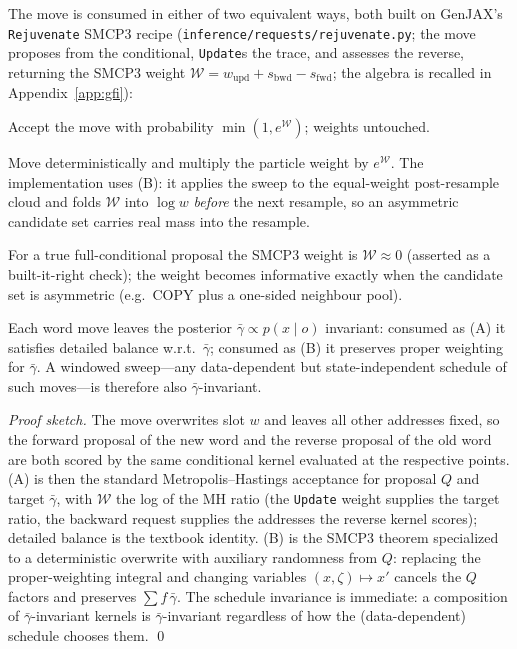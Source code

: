 \documentclass[11pt]{article}
\providecommand{\given}{\mid}
\providecommand{\code}[1]{\texttt{#1}}
\begin{document}
The move is consumed in either of two equivalent ways, both built on GenJAX's \code{Rejuvenate} SMCP3 recipe (\code{inference/requests/rejuvenate.py}; the move proposes from the conditional, \code{Update}s the trace, and assesses the reverse, returning the SMCP3 weight $\mathcal W = w_{\mathrm{upd}} + s_{\mathrm{bwd}} - s_{\mathrm{fwd}}$; the algebra is recalled in Appendix~\ref{app:gfi}):
\begin{description}[leftmargin=1.4em]
\item[(A) Metropolis--Hastings.] Accept the move with probability $\min(1, e^{\mathcal W})$; weights untouched.
\item[(B) SMCP3 reweighting.] Move deterministically and multiply the particle weight by $e^{\mathcal W}$. The implementation uses (B): it applies the sweep to the equal-weight post-resample cloud and folds $\mathcal W$ into $\log w$ \emph{before} the next resample, so an asymmetric candidate set carries real mass into the resample.
\end{description}
For a true full-conditional proposal the SMCP3 weight is $\mathcal W \approx 0$ (asserted as a built-it-right check); the weight becomes informative exactly when the candidate set is asymmetric (e.g.\ COPY plus a one-sided neighbour pool).

\begin{theorem}[Invariance]\label{thm:rejuv}
Each word move leaves the posterior $\bar\gamma\propto p(x\given o)$ invariant: consumed as (A) it satisfies detailed balance w.r.t.\ $\bar\gamma$; consumed as (B) it preserves proper weighting for $\bar\gamma$. A windowed sweep---any data-dependent but state-independent schedule of such moves---is therefore also $\bar\gamma$-invariant.
\end{theorem}
\begin{proof}[Proof sketch]
The move overwrites slot $w$ and leaves all other addresses fixed, so the forward proposal of the new word and the reverse proposal of the old word are both scored by the same conditional kernel evaluated at the respective points. (A) is then the standard Metropolis--Hastings acceptance for proposal $Q$ and target $\bar\gamma$, with $\mathcal W$ the log of the MH ratio (the \code{Update} weight supplies the target ratio, the backward request supplies the addresses the reverse kernel scores); detailed balance is the textbook identity. (B) is the SMCP3 theorem specialized to a deterministic overwrite with auxiliary randomness from $Q$: replacing the proper-weighting integral and changing variables $(x,\zeta)\mapsto x'$ cancels the $Q$ factors and preserves $\sum f\,\bar\gamma$. The schedule invariance is immediate: a composition of $\bar\gamma$-invariant kernels is $\bar\gamma$-invariant regardless of how the (data-dependent) schedule chooses them. \qed
\end{proof}
\end{document}
